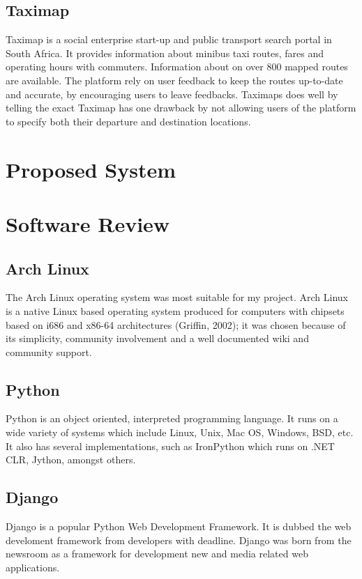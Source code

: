 \documentclass[oneside,12pt]{book}
\begin{document}

\subsection{Taximap}
Taximap is a social enterprise start-up and public transport search portal in South Africa. It provides information about minibus taxi routes, fares and operating hours with commuters. Information about on over 800 mapped routes are available. The platform rely on user feedback to keep the routes up-to-date and accurate, by encouraging users to leave feedbacks. Taximaps does well by telling the exact Taximap has one drawback by not allowing users of the platform to specify both their departure and destination locations. 


\section{Proposed System}

\section{Software Review}

\subsection{Arch Linux}
The Arch Linux operating system was most suitable for my project. Arch Linux is a native Linux based operating system produced for computers with chipsets based on i686 and x86-64 architectures (Griffin, 2002); it was chosen because of its simplicity, community involvement and a well documented wiki and community support.

\subsection{Python}
Python is an object oriented, interpreted programming language. It runs on a wide variety of systems which include Linux, Unix, Mac OS, Windows, BSD, etc. It also has several implementations, such as IronPython which runs on .NET CLR, Jython, amongst others. 

\subsection{Django}
Django is a popular Python Web Development Framework. It is dubbed the web develoment framework from developers with deadline. Django was born from the newsroom as a framework for development new and media related web applications.
\end{document}
